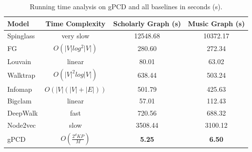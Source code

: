 \begin{table}
	\centering
	
	\begin{tabular}{lccc} 
		\toprule   
		\textbf{Model}& \textbf{Time Complexity} & \textbf{Scholarly Graph} (s)	& \textbf{Music Graph} (s)\\ \midrule
		Spinglass& very slow &12548.68	& 10372.17\\ \midrule
		FG& $O(|V|log^2|V|)$&280.60	& 272.34\\ \midrule
		Louvain& linear&80.01	&63.02\\ \midrule
		Walktrap&$O(|V|^2log|V|)$& 638.44	& 503.24\\ \midrule
		Infomap&$O(|V|(|V|+|E|))$ &501.79	&425.63\\ \midrule
		Bigclam&linear &57.01 	& 112.43\\ \midrule
		DeepWalk& fast&720.56	& 688.32\\ \midrule
		Node2vec& slow&	3508.44&3100.12\\ \midrule
		gPCD&$O(\frac{2^dKP}{M})$ &\textbf{5.25} &\textbf{6.50}\\ 
		\bottomrule
	\end{tabular}
	\caption{Running time analysis on gPCD and all baselines in seconds (s).}
	\label{tab:complexity}
\end{table}

